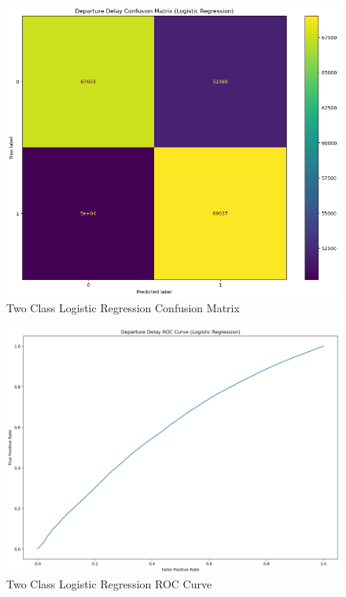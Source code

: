 \documentclass[a4paper,12pt]{article}
\begin{document}
\begin{figure}[!]
    \centering
    \includegraphics*[scale=.50]{../../img/model_rq2_cfmtrx_1.png}
    \caption[]{Two Class Logistic Regression Confusion Matrix}
    \label{fig:model:rq2:cfmtrx}
\end{figure}

\begin{figure}[!]
    \centering
    \includegraphics*[scale=.45]{../../img/model_rq2_roc.png}
    \caption[]{Two Class Logistic Regression ROC Curve}
    \label{fig:model:rq2:ROC}
\end{figure}
\end{document}
